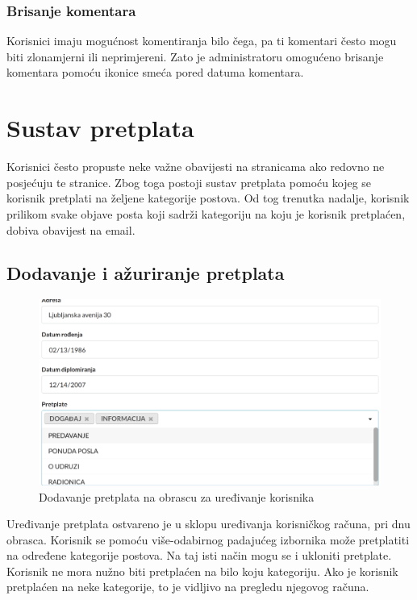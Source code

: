\documentclass[zavrsni, numeric]{fer}
\begin{document}
\subsubsection{Brisanje komentara}
Korisnici imaju mogućnost komentiranja bilo čega, pa ti komentari često mogu biti zlonamjerni ili neprimjereni. Zato je administratoru omogućeno brisanje komentara pomoću ikonice smeća pored datuma komentara.

\section{Sustav pretplata}
Korisnici često propuste neke važne obavijesti na stranicama ako redovno ne posjećuju te stranice. Zbog toga postoji sustav pretplata pomoću kojeg se korisnik pretplati na željene kategorije postova. Od tog trenutka nadalje, korisnik prilikom svake objave posta koji sadrži kategoriju na koju je korisnik pretplaćen, dobiva obavijest na email.

\subsection{Dodavanje i ažuriranje pretplata}

\begin{figure}[H]
	\centering
	\includegraphics[width=13cm]{slike/pretplate.png}
	\caption{Dodavanje pretplata na obrascu za uređivanje korisnika}
	\label{fig:pretplate}
\end{figure}

Uređivanje pretplata ostvareno je u sklopu uređivanja korisničkog računa, pri dnu obrasca. Korisnik se pomoću više-odabirnog padajućeg izbornika može pretplatiti na određene kategorije postova. Na taj isti način mogu se i ukloniti pretplate. Korisnik ne mora nužno biti pretplaćen na bilo koju kategoriju. Ako je korisnik pretplaćen na neke kategorije, to je vidljivo na pregledu njegovog računa.
\end{document}
